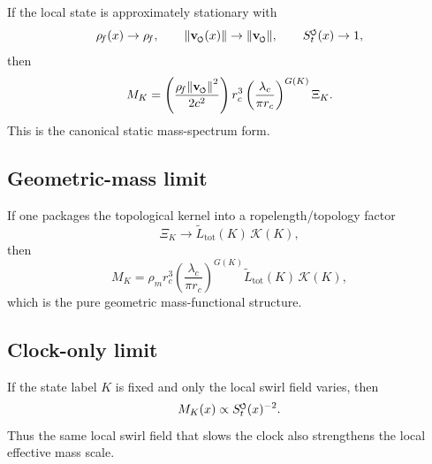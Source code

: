 \documentclass[11pt,a4paper]{article}
\newcommand{\swirlarrow}{\mathchoice{\mkern-2mu\scriptstyle\boldsymbol{\circlearrowleft}}{\mkern-2mu\scriptstyle\boldsymbol{\circlearrowleft}}{\mkern-2mu\scriptscriptstyle\boldsymbol{\circlearrowleft}}{\mkern-2mu\scriptscriptstyle\boldsymbol{\circlearrowleft}}}
\newcommand{\vswirl}{{\mathbf{v}_{\swirlarrow}}}
\newcommand{\SwirlClock}{{S_t^{\swirlarrow}}}
\newcommand{\rhoF}{\rho_{\!f}}
\newcommand{\rhoM}{\rho_{\!m}}
\providecommand{\rc}{r_c}
\begin{document}
                If the local state is approximately stationary with
                \begin{equation}
                    \rhoF(x)\to \rhoF,\qquad \norm{\vswirl(x)}\to \norm{\vswirl},\qquad \SwirlClock(x)\to 1,
                \end{equation}
                then
                \begin{equation}
                    M_K
                    =
                    \left(\frac{\rhoF\norm{\vswirl}^2}{2c^2}\right)\rc^3
                    \left(\frac{\lambda_c}{\pi \rc}\right)^{G(K)}
                    \Xi_K.
                \end{equation}
                This is the canonical static mass-spectrum form.
            
            \subsection{Geometric-mass limit}
                
                If one packages the topological kernel into a ropelength/topology factor
                \begin{equation}
                    \Xi_K \longrightarrow \widetilde{L}_{\mathrm{tot}}(K)\,\mathcal K(K),
                \end{equation}
                then
                \begin{equation}
                    M_K
                    =
                    \rhoM \rc^3
                    \left(\frac{\lambda_c}{\pi \rc}\right)^{G(K)}
                    \widetilde{L}_{\mathrm{tot}}(K)\,\mathcal K(K),
                \end{equation}
                which is the pure geometric mass-functional structure.
            
            \subsection{Clock-only limit}
                
                If the state label \(K\) is fixed and only the local swirl field varies, then
                \begin{equation}
                    M_K(x)\propto \SwirlClock(x)^{-2}.
                \end{equation}
                Thus the same local swirl field that slows the clock also strengthens the local effective mass scale.
        
\end{document}
